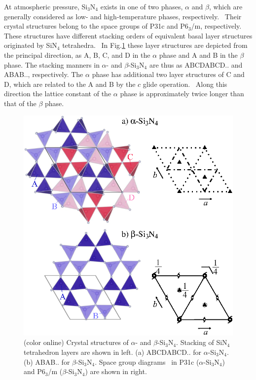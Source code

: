\documentclass[twocolumn,amsmath,amssymb,a4paper,prb,superscriptaddress,floatfix]{revtex4-1}
\begin{document}
At atmospheric pressure, Si$_3$N$_4$ exists in one of two phases, $\alpha$ and
$\beta$, which are generally considered as low- and high-temperature phases,
respectively.~\cite{zhou,hirosaki,riley} Their crystal structures belong to the
space groups of P31c and P6$_3$/m, respectively.~\cite{yashima,boulay} These
structures have different stacking orders of equivalent basal layer structures
originated by SiN$_4$ tetrahedra.~\cite{hampshire} In Fig.\ref{fig:Fig1_cryst}
these layer structures are depicted from the principal direction, as A, B, C,
and D in the $\alpha$ phase and A and B in the $\beta$ phase. The stacking
manners in $\alpha$- and $\beta$-Si$_3$N$_4$ are thus as ABCDABCD.. and ABAB..,
respectively.  The $\alpha$ phase has additional two layer structures of C and
D, which are related to the A and B by the $c$ glide operation.~\cite{hampshire}
Along this direction the lattice constant of the $\alpha$ phase is approximately
twice longer than that of the $\beta$ phase.
\begin{figure}[ht]
 \begin{center}
  \includegraphics[width=0.90\linewidth]{Fig1_crystal_str2.eps} \caption{(color
  online) Crystal structures of $\alpha$- and $\beta$-Si$_3$N$_4$. Stacking of
  SiN$_4$ tetrahedron layers are shown in left. (a) ABCDABCD.. for
  $\alpha$-Si$_3$N$_4$. (b) ABAB.. for $\beta$-Si$_3$N$_4$.  Space group
  diagrams~\cite{inttableA} in P31c ($\alpha$-Si$_3$N$_4$) and P6$_3$/m ($\beta$-Si$_3$N$_4$)
  are shown in right.}
  \label{fig:Fig1_cryst} 
 \end{center}
\end{figure}
\end{document}
